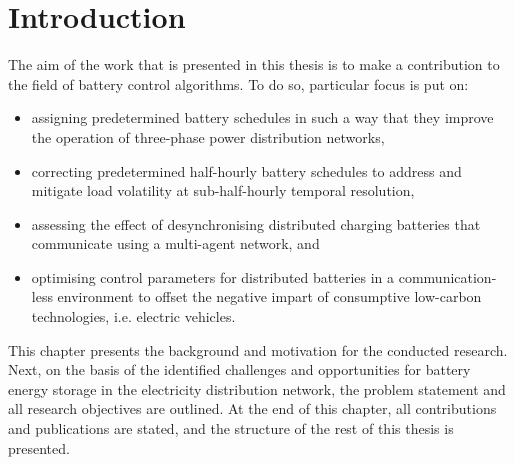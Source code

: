 \chapter{Introduction}
\label{ch-introduction}



The aim of the work that is presented in this thesis is to make a contribution to the field of battery control algorithms.
To do so, particular focus is put on:

\begin{itemize}
	\item assigning predetermined battery schedules in such a way that they improve the operation of three-phase power distribution networks,
	\item correcting predetermined half-hourly battery schedules to address and mitigate load volatility at sub-half-hourly temporal resolution,
	\item assessing the effect of desynchronising distributed charging batteries that communicate using a multi-agent network, and
	\item optimising control parameters for distributed batteries in a communication-less environment to offset the negative impart of consumptive low-carbon technologies, i.e. electric vehicles.
\end{itemize}

This chapter presents the background and motivation for the conducted research.
Next, on the basis of the identified challenges and opportunities for battery energy storage in the electricity distribution network, the problem statement and all research objectives are outlined.
At the end of this chapter, all contributions and publications are stated, and the structure of the rest of this thesis is presented.









